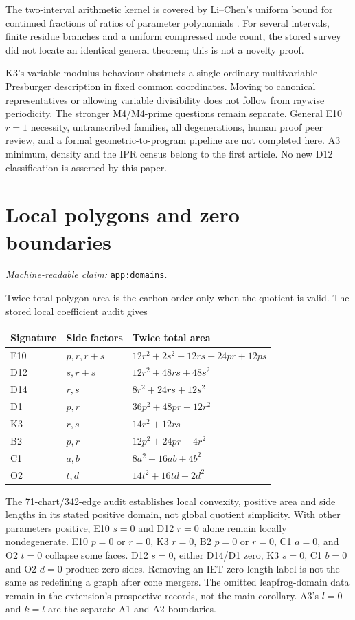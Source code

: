\documentclass[11pt]{amsart}
\newcommand{\record}[1]{\nolinkurl{#1}}
\newcommand{\claimid}[1]{\par\nopagebreak\noindent\textit{Machine-readable claim:} \record{#1}.\par}
\theoremstyle{definition}\newtheorem{definition}{Definition}
\begin{document}
The two-interval arithmetic kernel is covered by Li--Chen's uniform
bound for continued fractions of ratios of parameter polynomials
\cite[Theorem 27]{LiChen}. For several intervals, finite residue
branches and a uniform compressed node count, the stored survey did
not locate an identical general theorem; this is not a novelty proof.

K3's variable-modulus behaviour obstructs a single ordinary
multivariable Presburger description in fixed common coordinates.
Moving to canonical representatives or allowing variable divisibility
does not follow from raywise periodicity. The stronger M4/M4-prime
questions remain separate. General E10 $r=1$ necessity, untranscribed
families, all degenerations, human proof peer review, and a formal
geometric-to-program pipeline are not completed here. A3 minimum,
density and the IPR census belong to the first article. No new D12
classification is asserted by this paper.

\appendix
\section{Local polygons and zero boundaries}\label{app:domains}
\claimid{app:domains}
Twice total polygon area is the carbon order only when the quotient
is valid. The stored local coefficient audit gives
\begin{center}\small
\begin{tabular}{lll}\toprule
Signature & Side factors & Twice total area\\\midrule
E10 & $p,r,r+s$ & $12r^2+2s^2+12rs+24pr+12ps$\\
D12 & $s,r+s$ & $12r^2+48rs+48s^2$\\
D14 & $r,s$ & $8r^2+24rs+12s^2$\\
D1 & $p,r$ & $36p^2+48pr+12r^2$\\
K3 & $r,s$ & $14r^2+12rs$\\
B2 & $p,r$ & $12p^2+24pr+4r^2$\\
C1 & $a,b$ & $8a^2+16ab+4b^2$\\
O2 & $t,d$ & $14t^2+16td+2d^2$\\\bottomrule
\end{tabular}
\end{center}
The 71-chart/342-edge audit establishes local convexity, positive area
and side lengths in its stated positive domain, not global quotient
simplicity. With other parameters positive, E10 $s=0$ and D12 $r=0$
alone remain locally nondegenerate. E10 $p=0$ or $r=0$, K3 $r=0$,
B2 $p=0$ or $r=0$, C1 $a=0$, and O2 $t=0$ collapse some faces.
D12 $s=0$, either D14/D1 zero, K3 $s=0$, C1 $b=0$ and O2 $d=0$
produce zero sides. Removing an IET zero-length label is not the same
as redefining a graph after cone mergers. The omitted leapfrog-domain
data remain in the extension's prospective records, not the main
corollary. A3's $l=0$ and $k=l$ are the separate A1 and A2 boundaries.
\end{document}

